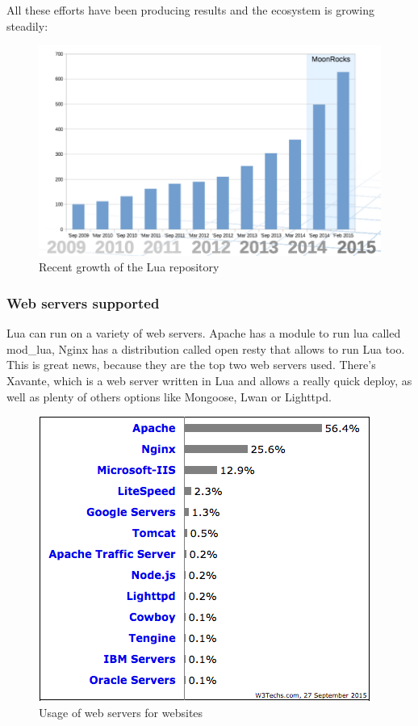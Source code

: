 \documentclass{article}
\begin{document}
All these efforts have been producing results and the ecosystem is growing steadily\autocite{luarockspresentation}: \\
\begin{figure}[h]
\centering\includegraphics[scale=0.5]{luamodules.png}
\caption{\label{fig:luamodules} Recent growth of the Lua repository}
\end{figure}

\subsubsection{Web servers supported}

Lua can run on a variety of web servers. Apache has a module to run lua called mod\_lua, Nginx has a distribution called open resty that allows to run Lua too. This is great news, because they are the top two web servers used\autocite{webservers}. There’s Xavante, which is a web server written in Lua and allows a really quick deploy, as well as plenty of others options like Mongoose, Lwan or Lighttpd. 
\begin{figure}[h]
\centering\includegraphics[scale=0.7]{webservers.png}
\caption{\label{fig:webservers} Usage of web servers for websites}
\end{figure}
\end{document}
